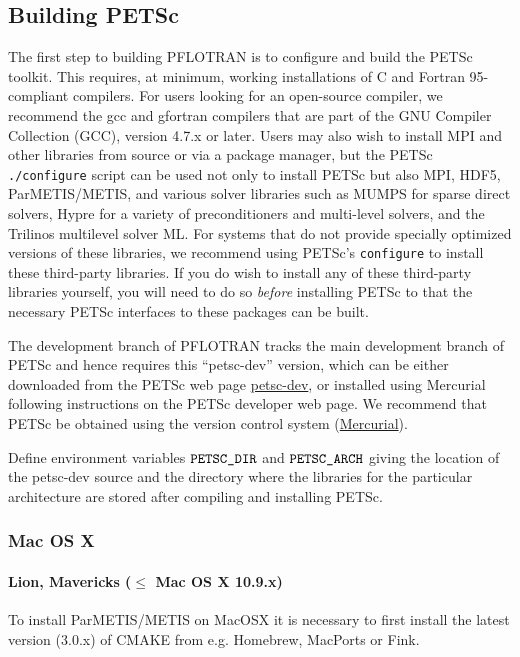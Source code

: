 \subsection{Building PETSc}

The first step to building PFLOTRAN is to configure and build the PETSc 
toolkit.
This requires, at minimum, working installations of C and Fortran 95-compliant 
compilers.
For users looking for an open-source compiler, we recommend the gcc and 
gfortran compilers that are part of the GNU Compiler Collection (GCC), version 
4.7.x or later.
Users may also wish to install MPI and other libraries from source or via a 
package manager, but the PETSc \texttt{./configure} script can be used not only 
to install PETSc but also MPI, HDF5, ParMETIS/METIS, and various solver 
libraries such as MUMPS for sparse direct solvers, Hypre for a variety of 
preconditioners and multi-level solvers, and the Trilinos multilevel solver ML. 
For systems that do not provide specially optimized versions of these 
libraries, we recommend using PETSc's \texttt{configure} to install these 
third-party libraries.
If you do wish to install any of these third-party libraries yourself, you 
will need to do so \textit{before} installing PETSc to that the necessary PETSc 
interfaces to these packages can be built.

The development branch of PFLOTRAN tracks the main development branch of 
PETSc and hence requires this ``petsc-dev'' version, which can be either 
downloaded from the PETSc web page 
\href{http://www.mcs.anl.gov/petsc/developers/index.html}{petsc-dev}, 
or installed using Mercurial following instructions on the PETSc developer web 
page. 
We recommend that PETSc be obtained using the version control system  
(\href{http://mercurial.selenic.com/wiki}{Mercurial}).

Define environment variables $\verb|PETSC_DIR|$ and $\verb|PETSC_ARCH|$ giving the location of the petsc-dev source and the directory where the libraries for the particular architecture are stored after compiling and installing PETSc.

\subsubsection{Mac OS X}

\paragraph{Lion, Mavericks ($\leq$ Mac OS X 10.9.x)} To install ParMETIS/METIS on MacOSX it is necessary to first install the latest version (3.0.x) of CMAKE from e.g. Homebrew, MacPorts or Fink.

